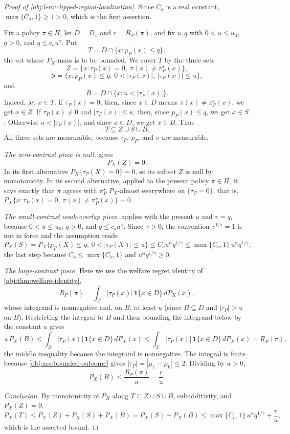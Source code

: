 \begin{proof}[Proof of \cref{obj:lem:clipped-region-localization}]
Since \(C_o\) is a real constant, \(\max\{C_o,1\}\ge1>0\), which is the first assertion. %

Fix a policy \(\pi\in\Pi\), let \(D=D_\pi\) and \(r=R_P(\pi)\), and fix \(u,q\) with
\(0<u\le u_0\), \(q>0\), and \(q\le c_o u^\gamma\).  Put
\[
T=D\cap\{x:p_P(x)\le q\},
\]
the set whose \(P_X\)-mass is to be bounded.  We cover \(T\) by the three sets
\[
Z=\{x:\tau_P(x)=0,\ \pi(x)\ne\pi^\star_P(x)\},
\]
\[
S=\{x:p_P(x)\le q,\ 0<|\tau_P(x)|,\ |\tau_P(x)|\le u\},
\]
and
\[
B=D\cap\{x:u<|\tau_P(x)|\}.
\]
Indeed, let \(x\in T\).  If \(\tau_P(x)=0\), then, since \(x\in D\) means \(\pi(x)\ne\pi^\star_P(x)\), we get \(x\in Z\).  If \(\tau_P(x)\ne0\) and \(|\tau_P(x)|\le u\), then, since \(p_P(x)\le q\), we get \(x\in S\).  Otherwise \(u<|\tau_P(x)|\), and since \(x\in D\), we get \(x\in B\).  Thus
\[
T\subseteq Z\cup S\cup B .
\]
All three sets are measurable, because \(\tau_P\), \(p_P\), and \(\pi\) are measurable. %

\emph{The zero-contrast piece is null.}   gives
\[
P_X(Z)=0 .
\]
In its first alternative \(P_X\{\tau_P(X)=0\}=0\), so its subset \(Z\) is null by monotonicity.  In its second alternative, applied to the present policy \(\pi\in\Pi\), it says exactly that \(\pi\) agrees with \(\pi^\star_P\) \(P_X\)-almost everywhere on \(\{\tau_P=0\}\), that is, \(P_X\{x:\tau_P(x)=0,\ \pi(x)\ne\pi^\star_P(x)\}=0\). %

\emph{The small-contrast weak-overlap piece.}   applies with the present \(u\) and \(v=q\), because \(0<u\le u_0\), \(q>0\), and \(q\le c_o u^\gamma\).  Since \(\gamma>0\), the convention \(v^{1/\gamma}=1\) is not in force and the assumption reads
\[
P_X(S)=P_X\{p_P(X)\le q,\ 0<|\tau_P(X)|\le u\}\le C_o u^\alpha q^{1/\gamma}
\le \max\{C_o,1\}\,u^\alpha q^{1/\gamma},
\]
the last step because \(C_o\le\max\{C_o,1\}\) and \(u^\alpha q^{1/\gamma}\ge0\). %

\emph{The large-contrast piece.}  Here we use the welfare regret identity of \cref{obj:thm:welfare-identity},
\[
R_P(\pi)=\int_{\mathcal X}|\tau_P(x)|\,\mathbf 1\{x\in D\}\,dP_X(x),
\]
whose integrand is nonnegative and, on \(B\), at least \(u\) (since \(B\subseteq D\) and \(|\tau_P|>u\) on \(B\)).  Restricting the integral to \(B\) and then bounding the integrand below by the constant \(u\) gives
\[
u\,P_X(B)
\le
\int_B|\tau_P(x)|\,\mathbf 1\{x\in D\}\,dP_X(x)
\le
\int_{\mathcal X}|\tau_P(x)|\,\mathbf 1\{x\in D\}\,dP_X(x)
=
R_P(\pi),
\]
the middle inequality because the integrand is nonnegative.  The integral is finite because \cref{obj:ass:bounded-outcome} gives \(|\tau_P|=|\mu_1-\mu_0|\le2\).  Dividing by \(u>0\),
\[
P_X(B)\le \frac{R_P(\pi)}{u}=\frac{r}{u}.
\]

\emph{Conclusion.}  By monotonicity of \(P_X\) along \(T\subseteq Z\cup S\cup B\), subadditivity, and \(P_X(Z)=0\),
\[
P_X(T)\le P_X(Z)+P_X(S)+P_X(B)=P_X(S)+P_X(B)
\le \max\{C_o,1\}\,u^\alpha q^{1/\gamma}+\frac{r}{u},
\]
which is the asserted bound. %
\end{proof}
